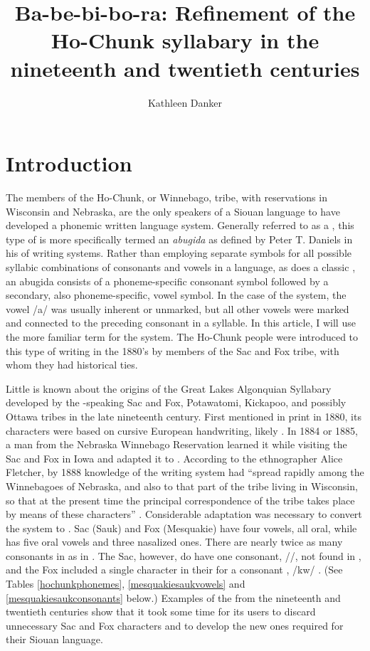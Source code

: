\documentclass[output=paper]{LSP/langsci}
\author{Kathleen Danker}
\title{Ba-be-bi-bo-ra: {R}efinement of the {Ho-Chunk} syllabary in the nineteenth and twentieth centuries}
\begin{document}
\section{Introduction}
The members of the Ho-Chunk, or Winnebago, tribe, with reservations in Wisconsin and Nebraska, are the only speakers of a Siouan language to have developed a phonemic written language system. Generally referred to as a , this type of  is more specifically termed an \emph{abugida} as defined by Peter T. Daniels in his \citeyear{Daniels1990}  of writing systems. Rather than employing separate symbols for all possible syllabic combinations of consonants and vowels in a language, as does a classic , an abugida consists of a phoneme-specific consonant symbol followed by a secondary, also phoneme-specific, vowel symbol. In the case of the  system, the vowel /a/ was usually inherent or unmarked, but all other vowels were marked and connected to the preceding consonant in a syllable. In this article, I will use the more familiar term  for the  system. The Ho-Chunk people were introduced to this type of writing in the 1880's by members of the Sac and Fox tribe, with whom they had historical ties. 

Little is known about the origins of the Great Lakes Algonquian Syllabary developed by the -speaking Sac and Fox, Potawatomi, Kickapoo, and possibly Ottawa tribes in the late nineteenth century. First mentioned in print in 1880, its characters were based on cursive European handwriting, likely  \citep[169]{Walker1996}. In 1884 or 1885, a man from the Nebraska Winnebago Reservation learned it while visiting the Sac and Fox in Iowa and adapted it to  \citep[354]{Fletcher1890b}. According to the ethnographer Alice Fletcher, by 1888 knowledge of the  writing system had ``spread rapidly among the Winnebagoes of Nebraska, and also to that part of the tribe living in Wisconsin, so that at the present time the principal correspondence of the tribe takes place by means of these characters'' \citeyearpar[299]{Fletcher1890a}. Considerable adaptation was necessary to convert the  system to . Sac (Sauk) and Fox (Mesquakie) have four vowels, all oral, while  has five oral vowels and three nasalized ones. There are nearly twice as many consonants in  as in . The Sac, however, do have one consonant, //, not found in , and the Fox included a single character in their  for a consonant , /kw/ \citep{Jones1906}. (See Tables \ref{hochunkphonemes}, \ref{mesquakiesaukvowels} and \ref{mesquakiesaukconsonants} below.) Examples of the   from the nineteenth and twentieth centuries show that it took some time for its users to discard unnecessary Sac and Fox characters and to develop the new ones required for their Siouan language. 
\end{document}
